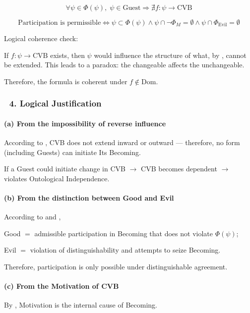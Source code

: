 \documentclass[12pt]{article}
\begin{document}
\[
\forall \psi \in \Phi(\psi),\; \psi \in \text{Guest} \Rightarrow \nexists f : \psi \rightarrow \text{CVB}
\]

\[
\text{Participation is permissible} \Leftrightarrow \psi \subset \Phi(\psi) \wedge \psi \cap \neg \Phi_M = \emptyset \wedge \psi \cap \Phi_{\text{Evil}} = \emptyset
\]

Logical coherence check:

If $f: \psi \to \text{CVB}$ exists, then $\psi$ would influence the structure of what, by \text{[13]}, cannot be extended. This leads to a paradox: the changeable affects the unchangeable.

Therefore, the formula is coherent under $f \notin \text{Dom}$.

\subsubsection*{🔹 4. Logical Justification}

\paragraph{(a) From the impossibility of reverse influence}

According to \text{[13]}, CVB does not extend inward or outward — therefore, no form (including Guests) can initiate Its Becoming.

If a Guest could initiate change in CVB $\to$ CVB becomes dependent $\to$ violates \text{[6]} Ontological Independence.

\paragraph{(b) From the distinction between Good and Evil}

According to \text{[11.3.2]} and \text{[11.3.3]},

Good $=$ admissible participation in Becoming that does not violate $\Phi(\psi)$;

Evil $=$ violation of distinguishability and attempts to seize Becoming.

Therefore, participation is only possible under distinguishable agreement.

\paragraph{(c) From the Motivation of CVB}

By \text{[18]}, Motivation is the internal cause of Becoming.
\end{document}

